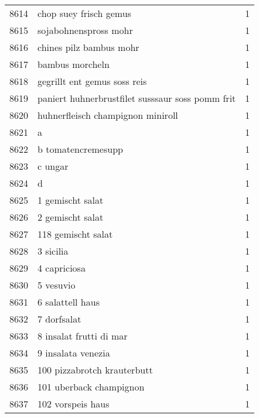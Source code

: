 \begin{tabular}{llr}
8614 &                             chop suey frisch gemus &      1 \\
8615 &                              sojabohnenspross mohr &      1 \\
8616 &                            chines pilz bambus mohr &      1 \\
8617 &                                    bambus morcheln &      1 \\
8618 &                       gegrillt ent gemus soss reis &      1 \\
8619 &   paniert huhnerbrustfilet susssaur soss pomm frit &      1 \\
8620 &                  huhnerfleisch champignon miniroll &      1 \\
8621 &                                                  a &      1 \\
8622 &                                 b tomatencremesupp &      1 \\
8623 &                                            c ungar &      1 \\
8624 &                                                  d &      1 \\
8625 &                                   1 gemischt salat &      1 \\
8626 &                                   2 gemischt salat &      1 \\
8627 &                                 118 gemischt salat &      1 \\
8628 &                                          3 sicilia &      1 \\
8629 &                                       4 capriciosa &      1 \\
8630 &                                          5 vesuvio &      1 \\
8631 &                                   6 salattell haus &      1 \\
8632 &                                        7 dorfsalat &      1 \\
8633 &                            8 insalat frutti di mar &      1 \\
8634 &                                 9 insalata venezia &      1 \\
8635 &                        100 pizzabrotch krauterbutt &      1 \\
8636 &                            101 uberback champignon &      1 \\
8637 &                                  102 vorspeis haus &      1 \\

\end{tabular}

